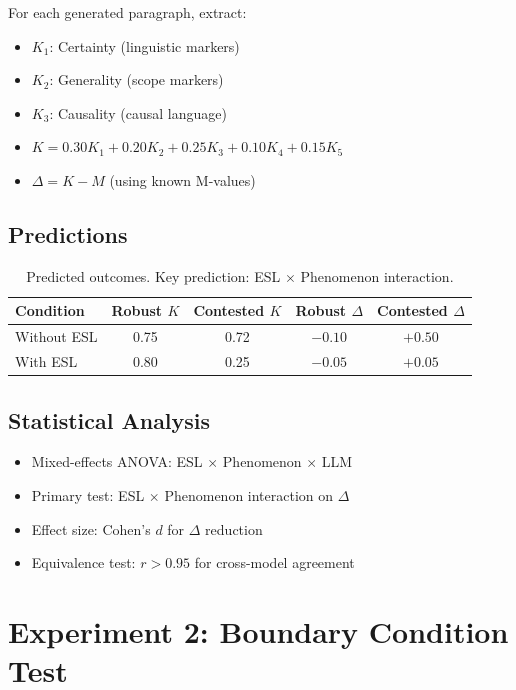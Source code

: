 \documentclass[11pt,a4paper]{article}
\begin{document}
For each generated paragraph, extract:
\begin{itemize}
    \item $K_1$: Certainty (linguistic markers)
    \item $K_2$: Generality (scope markers)
    \item $K_3$: Causality (causal language)
    \item $K = 0.30 K_1 + 0.20 K_2 + 0.25 K_3 + 0.10 K_4 + 0.15 K_5$
    \item $\Delta = K - M$ (using known M-values)
\end{itemize}

\subsection{Predictions}

\begin{table}[h]
\centering
\begin{tabular}{lcccc}
\toprule
\textbf{Condition} & \textbf{Robust $K$} & \textbf{Contested $K$} & \textbf{Robust $\Delta$} & \textbf{Contested $\Delta$} \\
\midrule
Without ESL & 0.75 & 0.72 & $-0.10$ & $+0.50$ \\
With ESL & 0.80 & 0.25 & $-0.05$ & $+0.05$ \\
\bottomrule
\end{tabular}
\caption{Predicted outcomes. Key prediction: ESL $\times$ Phenomenon interaction.}
\end{table}

\subsection{Statistical Analysis}

\begin{itemize}
    \item Mixed-effects ANOVA: ESL $\times$ Phenomenon $\times$ LLM
    \item Primary test: ESL $\times$ Phenomenon interaction on $\Delta$
    \item Effect size: Cohen's $d$ for $\Delta$ reduction
    \item Equivalence test: $r > 0.95$ for cross-model agreement
\end{itemize}


\section{Experiment 2: Boundary Condition Test}
\end{document}
